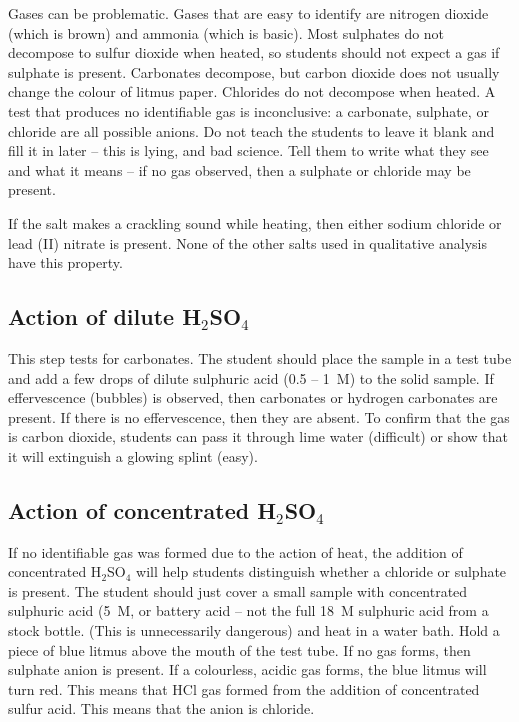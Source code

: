 Gases can be problematic. 
Gases that are easy to identify are nitrogen dioxide 
(which is brown) and ammonia (which is basic). 
Most sulphates do not decompose to sulfur dioxide when heated, 
so students should not expect a gas if sulphate is present. 
Carbonates decompose, 
but carbon dioxide does not usually change the colour of litmus paper. 
Chlorides do not decompose when heated. 
A test that produces no identifiable gas is inconclusive: a carbonate, 
sulphate, 
or chloride are all possible anions. 
Do not teach the students to leave it blank and fill it in later – 
this is lying, 
and bad science. 
Tell them to write what they see and what it means – if no gas observed, 
then a sulphate or chloride may be present.

If the salt makes a crackling sound while heating, 
then either sodium chloride or lead (II) nitrate is present. 
None of the other salts used in qualitative analysis have this property.

\subsection{Action of dilute H$_{2}$SO$_{4}$}
This step tests for carbonates. 
The student should place the sample in a test tube 
and add a few drops of dilute sulphuric acid 
(0.5 -- 1~M) to the solid sample. 
If effervescence (bubbles) is observed, 
then carbonates or hydrogen carbonates are present. 
If there is no effervescence, 
then they are absent. 
To confirm that the gas is carbon dioxide, 
students can pass it through lime water 
(difficult) or show that it will extinguish a glowing splint (easy).

\subsection{Action of concentrated H$_{2}$SO$_{4}$}
If no identifiable gas was formed due to the action of heat, 
the addition of concentrated H$_{2}$SO$_{4}$ will help students 
distinguish whether a chloride or sulphate is present. 
The student should just cover a small sample 
with concentrated sulphuric acid (5~M, 
or battery acid -- not the full 18~M sulphuric acid from a stock bottle. 
(This is unnecessarily dangerous) and heat in a water bath. 
Hold a piece of blue litmus above the mouth of the test tube. 
If no gas forms, 
then sulphate anion is present. 
If a colourless, 
acidic gas forms, 
the blue litmus will turn red. 
This means that HCl gas formed from the addition of concentrated sulfur acid. 
This means that the anion is chloride. 

